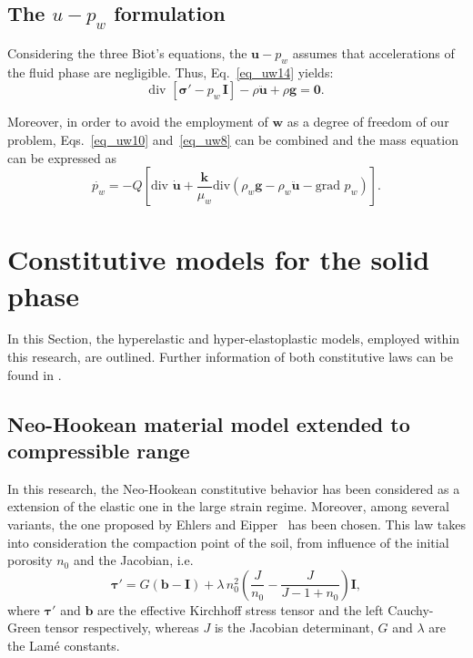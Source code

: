 \documentclass[twocolumn]{svjour3}          %
\begin{document}
\subsection{The $u-p_w$ formulation}
\label{subsec:23}
Considering the three Biot's equations, the $\boldsymbol{u}-p_w$ assumes that accelerations of the fluid phase are negligible. Thus, Eq.~\eqref{eq_uw14} yields:
\begin{equation}\label{eq_uw15}
\mbox{div }\left[ \boldsymbol{ \sigma'} - p_{w} \, \textbf{I} \right]-\rho\boldsymbol{\ddot{u}}+\rho\boldsymbol{g}=\boldsymbol{0}.
\end{equation}

Moreover, in order to avoid the employment of $\boldsymbol{w}$ as a degree of freedom of our problem, Eqs.~\eqref{eq_uw10} and~\eqref{eq_uw8} can be combined and the mass equation can be expressed as
\begin{equation}\label{eq_uw11}
\dot{p_w} = -Q\left [ \mbox{div } \dot{\boldsymbol{u}} + \frac{\boldsymbol{k}}{\mu_w} \mbox{div}\left(   \rho_w \boldsymbol{g} - \rho_w \ddot{\boldsymbol{u}} - \mbox{grad }p_w\right)\right ].
\end{equation}


\section{Constitutive models for the solid phase} \label{sec:3}
In this Section, the hyperelastic and hyper-elastoplastic models, employed within this research, are outlined. Further information of both constitutive laws can be found in \cite{Navas2018,Navas:17b,Navas:17c}.
\subsection{Neo-Hookean material model extended to compressible range} \label{subsec:31}

In this research, the Neo-Hookean constitutive behavior has been considered as a extension of the elastic one in the large strain regime. Moreover, among several variants, the one proposed by Ehlers and Eipper~\cite{Ehlers:99} has been chosen. This law takes into consideration the compaction point of the soil, from influence of  the initial porosity  $n_0$ and the Jacobian, i.e.
\begin{equation}\label{eq_nh2}
\boldsymbol{\tau}'=G(\boldsymbol{b}-\textbf{I})+\lambda \, n_0^2\left(  \frac{J}{n_0}-\frac{J}{J-1+n_0} \right)\textbf{I},
\end{equation}
where $\boldsymbol{\tau}'$ and  $\boldsymbol{b}$ are the effective Kirchhoff stress tensor and the left Cauchy-Green tensor respectively, whereas $J$ is the Jacobian determinant, $G$ and $\lambda$ are the Lam\'e constants.  
\end{document}
